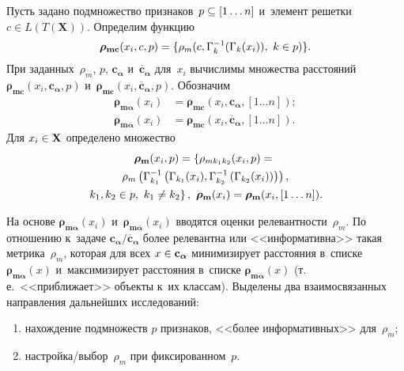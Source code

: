 \begin{multicols}{2}
     Пусть задано подмножество признаков~$p \hm\subseteq [1\ldots n]$ 
     и~элемент решетки $c\in L(T(\mathbf{X}))$. Определим функцию 
$$
\bm{\rho}_{\mathbf{mc}} (x_i, c, {p}) \hm= \{ \rho_m(c, \Gamma_k^{-1}(\Gamma_k (x_i)),\ k\hm\in {p})\}.
$$
 При заданных~$\rho_m$, $p$, 
$\mathbf{c}_{\bm{\alpha}}$ и~$\overline{\mathbf{c}}_{\bm{\alpha}}$ 
для~$x_i$ вычислимы множества расстояний $\bm{\rho}_{\mathbf{mc}}(x_i, 
\mathbf{c}_{\bm{\alpha}}, {p})$ и~$\bm{\rho}_{\mathbf{mc}}(x_i, 
\overline{\mathbf{c}}_{\bm{\alpha}}, {p})$. Обозначим 
\begin{align*}
\bm{\rho}_{\mathbf{m}\bm{\alpha}}(x_i) &=  \bm{\rho}_{\mathbf{mc}} 
(x_i, \mathbf{c}_{\bm{\alpha}}, [1\ldots n]); \\
\bm{\rho}_{\mathbf{m}\overline{\bm{\alpha}}} (x_i) &= 
\bm{\rho}_{\mathbf{mc}}(x_i, \overline{\mathbf{c}}_{\bm{\alpha}} , [1\ldots n]).
\end{align*}
 Для $x_i\hm\in \mathbf{X}$ 
определено множество 
\begin{multline*}
\bm{\rho}_{\mathbf{m}}(x_i,{p})=\left \{ \rho_{mk_1k_2}(x_i, {p}) = {}\right.\\
{}\rho_m\left(\Gamma^{-1}_{k_1}\left(\Gamma_{k_1}(x_i), \Gamma^{-1}_{k_2}\left(\Gamma_{k_2}(x_i)\right)\right)\right),\\
\left. k_1, k_2\hm \in {p},\  k_1\not= k_2\right\},\ \bm{\rho}_{\mathbf{m}}(x_i)=  \bm{\rho}_{\mathbf{m}}(x_i, [1\ldots n]).
\end{multline*}
     
     На основе $\bm{\rho}_{\mathbf{m}{\bm{\alpha}}}(x_i)$ 
и~$\bm{\rho}_{\mathbf{m}\overline{\bm{\alpha}}}(x_i)$ вводятся оценки 
релевантности~$\rho_m$. По отношению к~задаче $\mathbf{c}_{\bm{\alpha}}/ 
\overline{\mathbf{c}}_{\bm{\alpha}}$ более релевантна или 
<<информативна>> такая мет\-ри\-ка~$\rho_m$, которая для всех $x\hm\in 
\mathbf{c}_{\bm{\alpha}}$ минимизирует расстояния в~списке 
$\bm{\rho}_{\mathbf{m}{\bm{\alpha}}}(x)$ и~максимизирует расстояния 
в~списке $\bm{\rho}_{\mathbf{m}\overline{\bm{\alpha}}}(x)$ (т.\,е.\ 
<<приближает>> объекты к~их классам). Выделены два взаимосвязанных 
направления дальнейших исследований: 
\begin{enumerate}[(1)]
\item нахождение подмножеств $p$ 
признаков, <<более информативных>> для~$\rho_m$;  
\item на\-строй\-ка/вы\-бор~$\rho_m$ при фиксированном~$p$.
\end{enumerate}
     

\end{multicols}
